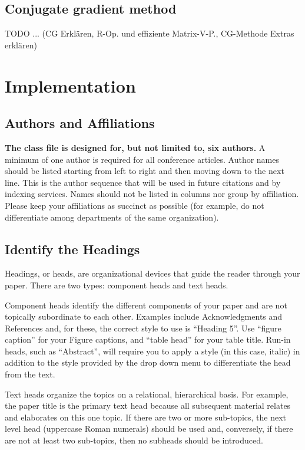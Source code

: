 \documentclass[conference]{IEEEtran}
\begin{document}
\subsection{Conjugate gradient method}
TODO ... (CG Erklären, R-Op. und effiziente Matrix-V-P., CG-Methode Extras erklären)

\section {Implementation}

\subsection{Authors and Affiliations}
\textbf{The class file is designed for, but not limited to, six authors.} A 
minimum of one author is required for all conference articles. Author names 
should be listed starting from left to right and then moving down to the 
next line. This is the author sequence that will be used in future citations 
and by indexing services. Names should not be listed in columns nor group by 
affiliation. Please keep your affiliations as succinct as possible (for 
example, do not differentiate among departments of the same organization).

\subsection{Identify the Headings}
Headings, or heads, are organizational devices that guide the reader through 
your paper. There are two types: component heads and text heads.

Component heads identify the different components of your paper and are not 
topically subordinate to each other. Examples include Acknowledgments and 
References and, for these, the correct style to use is ``Heading 5''. Use 
``figure caption'' for your Figure captions, and ``table head'' for your 
table title. Run-in heads, such as ``Abstract'', will require you to apply a 
style (in this case, italic) in addition to the style provided by the drop 
down menu to differentiate the head from the text.

Text heads organize the topics on a relational, hierarchical basis. For 
example, the paper title is the primary text head because all subsequent 
material relates and elaborates on this one topic. If there are two or more 
sub-topics, the next level head (uppercase Roman numerals) should be used 
and, conversely, if there are not at least two sub-topics, then no subheads 
should be introduced.
\end{document}
